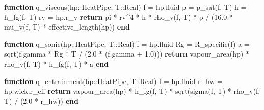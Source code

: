 \documentclass[
  indonesian,
  12pt,
  a4paper,
]{report}
\newenvironment{Shaded}{\begin{snugshade}}{\end{snugshade}}
\newcommand{\ConstantTok}[1]{\textcolor[rgb]{0.56,0.35,0.01}{#1}}
\newcommand{\ControlFlowTok}[1]{\textcolor[rgb]{0.00,0.23,0.31}{\textbf{#1}}}
\newcommand{\DataTypeTok}[1]{\textcolor[rgb]{0.68,0.00,0.00}{#1}}
\newcommand{\FloatTok}[1]{\textcolor[rgb]{0.68,0.00,0.00}{#1}}
\newcommand{\FunctionTok}[1]{\textcolor[rgb]{0.28,0.35,0.67}{#1}}
\newcommand{\KeywordTok}[1]{\textcolor[rgb]{0.00,0.23,0.31}{\textbf{#1}}}
\newcommand{\NormalTok}[1]{\textcolor[rgb]{0.00,0.23,0.31}{#1}}
\newcommand{\OperatorTok}[1]{\textcolor[rgb]{0.37,0.37,0.37}{#1}}
\begin{document}
\begin{Shaded}
\begin{Highlighting}[]
\KeywordTok{function} \FunctionTok{q\_viscous}\NormalTok{(hp}\OperatorTok{::}\DataTypeTok{HeatPipe}\NormalTok{, T}\OperatorTok{::}\DataTypeTok{Real}\NormalTok{)}
\NormalTok{    f }\OperatorTok{=}\NormalTok{ hp.fluid}
\NormalTok{    p }\OperatorTok{=} \FunctionTok{p\_sat}\NormalTok{(f, T)}
\NormalTok{    h }\OperatorTok{=} \FunctionTok{h\_fg}\NormalTok{(f, T)}
\NormalTok{    rv }\OperatorTok{=}\NormalTok{ hp.r\_v}
    \ControlFlowTok{return} \ConstantTok{pi} \OperatorTok{*}\NormalTok{ rv}\OperatorTok{\^{}}\FloatTok{4} \OperatorTok{*}\NormalTok{ h }\OperatorTok{*} \FunctionTok{rho\_v}\NormalTok{(f, T) }\OperatorTok{*}\NormalTok{ p }\OperatorTok{/}
\NormalTok{           (}\FloatTok{16.0} \OperatorTok{*} \FunctionTok{mu\_v}\NormalTok{(f, T) }\OperatorTok{*} \FunctionTok{effective\_length}\NormalTok{(hp))}
\KeywordTok{end}

\KeywordTok{function} \FunctionTok{q\_sonic}\NormalTok{(hp}\OperatorTok{::}\DataTypeTok{HeatPipe}\NormalTok{, T}\OperatorTok{::}\DataTypeTok{Real}\NormalTok{)}
\NormalTok{    f }\OperatorTok{=}\NormalTok{ hp.fluid}
\NormalTok{    Rg }\OperatorTok{=} \FunctionTok{R\_specific}\NormalTok{(f)}
\NormalTok{    a }\OperatorTok{=} \FunctionTok{sqrt}\NormalTok{(f.gamma }\OperatorTok{*}\NormalTok{ Rg }\OperatorTok{*}\NormalTok{ T }\OperatorTok{/}\NormalTok{ (}\FloatTok{2.0} \OperatorTok{*}\NormalTok{ (f.gamma }\OperatorTok{+} \FloatTok{1.0}\NormalTok{)))}
    \ControlFlowTok{return} \FunctionTok{vapour\_area}\NormalTok{(hp) }\OperatorTok{*} \FunctionTok{rho\_v}\NormalTok{(f, T) }\OperatorTok{*} \FunctionTok{h\_fg}\NormalTok{(f, T) }\OperatorTok{*}\NormalTok{ a}
\KeywordTok{end}

\KeywordTok{function} \FunctionTok{q\_entrainment}\NormalTok{(hp}\OperatorTok{::}\DataTypeTok{HeatPipe}\NormalTok{, T}\OperatorTok{::}\DataTypeTok{Real}\NormalTok{)}
\NormalTok{    f }\OperatorTok{=}\NormalTok{ hp.fluid}
\NormalTok{    r\_hw }\OperatorTok{=}\NormalTok{ hp.wick.r\_eff}
    \ControlFlowTok{return} \FunctionTok{vapour\_area}\NormalTok{(hp) }\OperatorTok{*} \FunctionTok{h\_fg}\NormalTok{(f, T) }\OperatorTok{*}
           \FunctionTok{sqrt}\NormalTok{(}\FunctionTok{sigma}\NormalTok{(f, T) }\OperatorTok{*} \FunctionTok{rho\_v}\NormalTok{(f, T) }\OperatorTok{/}\NormalTok{ (}\FloatTok{2.0} \OperatorTok{*}\NormalTok{ r\_hw))}
\KeywordTok{end}
\end{Highlighting}
\end{Shaded}
\end{document}
